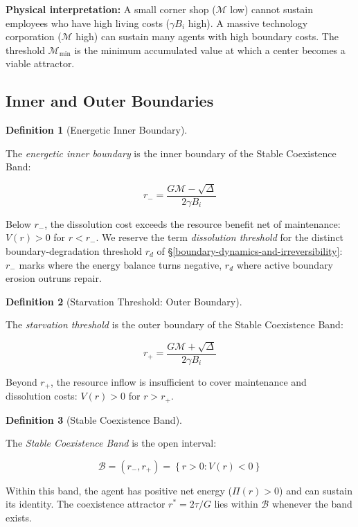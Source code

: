 \documentclass[11pt]{article}
\theoremstyle{plain}
\theoremstyle{definition}
\newtheorem{definition}{Definition}
\theoremstyle{remark}
\let\origsubsection\subsection
\renewcommand{\subsection}{\needspace{7\baselineskip}\origsubsection}
\begin{document}
\textbf{Physical interpretation:} A small corner shop (\(\mathcal{M}\)
low) cannot sustain employees who have high living costs (\(\gamma B_i\)
high). A massive technology corporation (\(\mathcal{M}\) high) can
sustain many agents with high boundary costs. The threshold
\(\mathcal{M}_{\min}\) is the minimum accumulated value at which a
center becomes a viable attractor.

\subsection{Inner and Outer
Boundaries}\label{inner-and-outer-boundaries}

\begin{definition}[Energetic Inner Boundary]
\label{def-dissolution-threshold}

The \emph{energetic inner boundary} is the inner boundary of the Stable Coexistence Band:

$$r_- = \frac{G\mathcal{M} - \sqrt{\Delta}}{2\gamma B_i}$$

Below $r_-$, the dissolution cost exceeds the resource benefit net of maintenance: $V(r) > 0$ for $r < r_-$. We reserve the term \emph{dissolution threshold} for the distinct boundary-degradation threshold $r_d$ of §\ref{boundary-dynamics-and-irreversibility}: $r_-$ marks where the energy balance turns negative, $r_d$ where active boundary erosion outruns repair.
\end{definition}

\begin{definition}[Starvation Threshold: Outer Boundary]
\label{def-starvation-threshold}

The \emph{starvation threshold} is the outer boundary of the Stable Coexistence Band:

$$r_+ = \frac{G\mathcal{M} + \sqrt{\Delta}}{2\gamma B_i}$$

Beyond $r_+$, the resource inflow is insufficient to cover maintenance and dissolution costs: $V(r) > 0$ for $r > r_+$.
\end{definition}

\begin{definition}[Stable Coexistence Band]
\label{def-stable-coexistence-band}

The \emph{Stable Coexistence Band} is the open interval:

$$\mathcal{B} = (r_-, r_+) = \left\{r > 0 : V(r) < 0\right\}$$

Within this band, the agent has positive net energy ($\Pi(r) > 0$) and can sustain its identity. The coexistence attractor $r^* = 2\tau / G$ lies within $\mathcal{B}$ whenever the band exists.
\end{definition}
\end{document}
